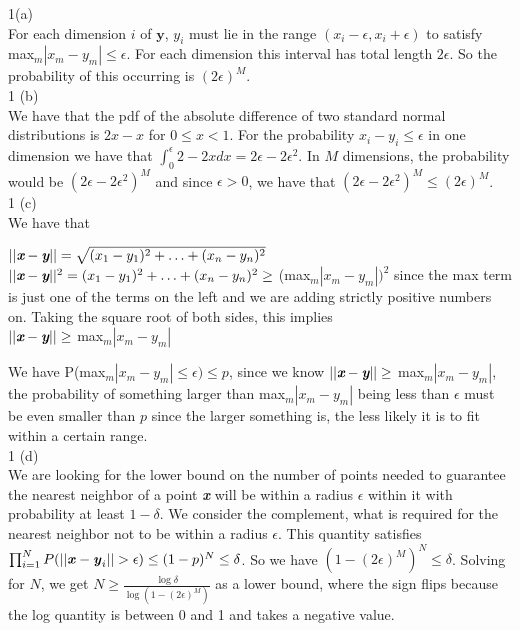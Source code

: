 \documentclass[12pt]{scrartcl}
\begin{document}
1(a) \\

For each dimension $i$ of \textit{$\textbf{y}$}, $y_i$ must lie in the range $(x_i - \epsilon, x_i + \epsilon)$ to satisfy max$_m |x_m - y_m| \leq \epsilon$. For each dimension this interval has total length $2\epsilon$. So the probability of this occurring is $(2\epsilon)^M$. \\

1 (b) \\

We have that the pdf of the absolute difference of two standard normal distributions is $2x -x$ for $0 \leq x < 1$. For the probability $x_i - y_i \leq \epsilon$ in one dimension we have that $\int_0^\epsilon 2 - 2x dx = 2\epsilon - 2\epsilon^2$. In $M$ dimensions, the probability would be $(2\epsilon - 2\epsilon^2)^M$ and since $\epsilon > 0$, we have that $(2\epsilon - 2\epsilon^2)^M \leq(2\epsilon)^M$. \\

1 (c) \\

We have that 

\begin{center}

$||\textit{\textbf{x}} - \textit{\textbf{y}}|| = \sqrt{(x_1 - y_1)^2 + \ldots + (x_n - y_n)^2} $ \\[12pt]
$||\textit{\textbf{x}} - \textit{\textbf{y}}||^2 = (x_1 - y_1)^2 + \ldots + (x_n - y_n)^2 \geq$ (max$_{m} |x_m - y_m|)^2$ since the max term is just one of the terms on the left and we are adding strictly positive numbers on. Taking the square root of both sides, this implies \\[12pt]
$||\textit{\textbf{x}} - \textit{\textbf{y}}|| \geq$ max$_m |x_m - y_m|$ 

\end{center}

We have P(max$_m |x_m - y_m| \leq \epsilon) \leq p$, since we know $||\textit{\textbf{x}} - \textit{\textbf{y}}|| \geq$ max$_m |x_m - y_m|$, the probability of something larger than max$_m|x_m - y_m|$ being less than $\epsilon$ must be even smaller than $p$ since the larger something is, the less likely it is to fit within a certain range. \\

1 (d) \\

We are looking for the lower bound on the number of points needed to guarantee the nearest neighbor of a point \textbf{\textit{x}} will be within a radius $\epsilon$ within it with probability at least $1 - \delta$. We consider the complement, what is required for the nearest neighbor not to be within a radius $\epsilon$. This quantity satisfies $\prod_{i=1}^NP(||\textbf{\textit{x}} - \textbf{\textit{y}}_i|| > \epsilon) \leq (1 - p)^N \leq \delta$. So we have $(1-(2\epsilon)^M)^N \leq \delta$. Solving for $N$, we get $N \geq \frac{\log \delta}{\log(1-(2\epsilon)^M)}$ as a lower bound, where the sign flips because the log quantity is between 0 and 1 and takes a negative value. \\
\end{document}
